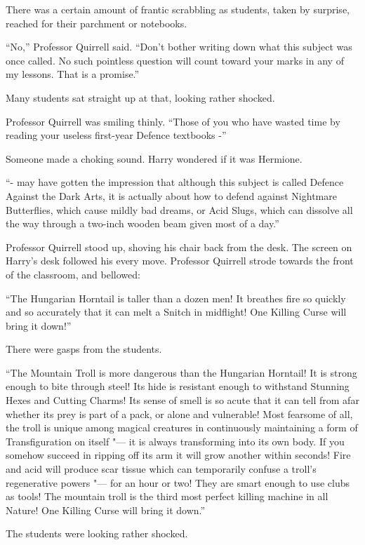 There was a certain amount of frantic scrabbling as students, taken by
surprise, reached for their parchment or notebooks.

``No,'' Professor Quirrell said. ``Don't bother writing down what this
subject was once called. No such pointless question will count toward
your marks in any of my lessons. That is a promise.''

Many students sat straight up at that, looking rather shocked.

Professor Quirrell was smiling thinly. ``Those of you who have wasted
time by reading your useless first-year Defence textbooks -''

Someone made a choking sound. Harry wondered if it was Hermione.

``- may have gotten the impression that although this subject is called
Defence Against the Dark Arts, it is actually about how to defend
against Nightmare Butterflies, which cause mildly bad dreams, or Acid
Slugs, which can dissolve all the way through a two-inch wooden beam
given most of a day.''

Professor Quirrell stood up, shoving his chair back from the desk. The
screen on Harry's desk followed his every move. Professor Quirrell
strode towards the front of the classroom, and bellowed:

``The Hungarian Horntail is taller than a dozen men! It breathes fire so
quickly and so accurately that it can melt a Snitch in midflight! One
Killing Curse will bring it down!''

There were gasps from the students.

``The Mountain Troll is more dangerous than the Hungarian Horntail! It
is strong enough to bite through steel! Its hide is resistant enough to
withstand Stunning Hexes and Cutting Charms! Its sense of smell is so
acute that it can tell from afar whether its prey is part of a pack, or
alone and vulnerable! Most fearsome of all, the troll is unique among
magical creatures in continuously maintaining a form of Transfiguration
on itself "--- it is always transforming into its own body. If you somehow
succeed in ripping off its arm it will grow another within seconds! Fire
and acid will produce scar tissue which can temporarily confuse a
troll's regenerative powers "--- for an hour or two! They are smart enough
to use clubs as tools! The mountain troll is the third most perfect
killing machine in all Nature! One Killing Curse will bring it down.''

The students were looking rather shocked.

